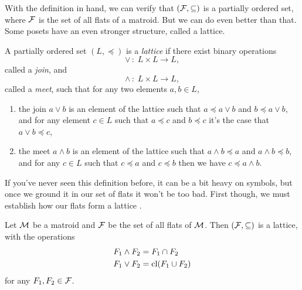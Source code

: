 \documentclass[12pt,oneside]{../../sfsuthesis}
\begin{document}
With the definition in hand, we can verify that \( (\mathcal{F}, \subseteq) \) is a partially ordered set, where \( \mathcal{F} \) is the set of all flats of a matroid.
But we can do even better than that.
Some posets have an even stronger structure, called a lattice.

\begin{definition}[Lattice]\th\label{def:lattice}
    A partially ordered set \( (L, \preceq) \) is a \emph{lattice} if there exist binary operations
    \[
        \vee \, : \; L \times L \to L,
    \]
    called a \emph{join}, and
    \[
        \wedge \, : \; L \times L \to L,
    \]
    called a \emph{meet}, such that for any two elements \( a, b \in L \),
    \begin{enumerate}[label=\roman*.]
        \item the join \(a \vee b \) is an element of the lattice such that \( a \preceq a \vee b \) and \( b \preceq a \vee b \), and for any element \( c \in L \) such that \( a \preceq c \) and \( b \preceq c \) it's the case that \( a \vee b \preceq c \),
        \item the meet \(a \wedge b \) is an element of the lattice such that  \( a \wedge b \preceq a \) and \( a \wedge b \preceq b \), and for any \( c \in L \) such that \( c \preceq a \) and \( c \preceq b \) then we have \( c \preceq a \wedge b \).
    \end{enumerate}

\end{definition}

If you've never seen this definition before, it can be a bit heavy on symbols, but once we ground it in our set of flats it won't be too bad.
First though, we must establish how our flats form a lattice \cite[Lemma~1.7.3]{oxleyMatroidTheory2011}.

\begin{proposition}\th\label{thm:flatLattice}
    Let \( \mathcal{M} \) be a matroid and \( \mathcal{F} \) be the set of all flats of \( \mathcal{M} \).
    Then \( ( \mathcal{F}, \subseteq) \) is a lattice, with the operations
    \begin{align*}
        F_1 \wedge F_2 & = F_1 \cap F_2      \\
        F_1 \vee F_2   & = \operatorname{cl}(F_1 \cup F_2)
    \end{align*}
    for any \( F_1, F_2 \in \mathcal{F} \).
\end{proposition}
\end{document}
